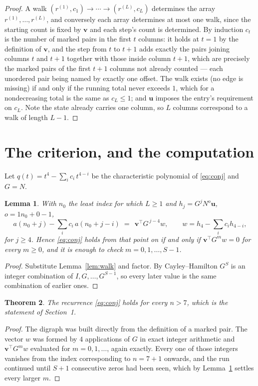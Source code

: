 \documentclass[11pt,a4paper]{article}
\theoremstyle{plain}
\newtheorem{theorem}{Theorem}
\newtheorem{lemma}[theorem]{Lemma}
\theoremstyle{definition}
\begin{document}
\begin{proof}
A walk $(r^{(1)},c_1)\to\cdots\to(r^{(L)},c_L)$ determines the array
$r^{(1)},\dots,r^{(L)}$, and conversely each array determines at most one walk, since the
starting count is fixed by $\mathbf{v}$ and each step's count is determined. By induction
$c_t$ is the number of marked pairs in the first $t$ columns: it holds at $t=1$ by the
definition of $\mathbf{v}$, and the step from $t$ to $t+1$ adds exactly the pairs joining
columns $t$ and $t+1$ together with those inside column $t+1$, which are precisely the marked
pairs of the first $t+1$ columns not already counted --- each unordered pair being named by
exactly one offset. The walk exists (no edge is missing) if and only if the running total
never exceeds $1$, which for a nondecreasing total is the same as $c_L\le1$; and
$\mathbf{u}$ imposes the entry's requirement on $c_L$. Note the state already carries one
column, so $L$ columns correspond to a walk of length $L-1$.
\end{proof}

\section{The criterion, and the computation}

Let $q(t)=t^{4}-\sum_i c_i\,t^{4-i}$ be the characteristic polynomial of
\eqref{eq:conj} and $G=N$.

\begin{lemma}\label{lem:crit}
With $n_0$ the least index for which $L\ge1$ and $h_j=G^{j}N^{o}\mathbf{u}$,
$o=1n_0+0-1$,
\[
a(n_0+j)-\sum_i c_i\,a(n_0+j-i)\;=\;\,\mathbf{v}^{\!\top}G^{\,j-4}w,
\qquad w=h_{4}-\sum_i c_i h_{4-i},
\]
for $j\ge4$. Hence \eqref{eq:conj} holds from that point on if and only if
$\mathbf{v}^{\!\top}G^{m}w=0$ for every $m\ge0$, and it is enough to check
$m=0,1,\dots,S-1$.
\end{lemma}

\begin{proof}
Substitute Lemma~\ref{lem:walk} and factor. By Cayley--Hamilton $G^{S}$ is an integer
combination of $I,G,\dots,G^{S-1}$, so every later value is the same combination of earlier
ones.
\end{proof}

\begin{theorem}
The recurrence \eqref{eq:conj} holds for every $n>7$, which is the statement of
Section~1.
\end{theorem}

\begin{proof}
The digraph was built directly from the definition of a marked pair. The vector $w$ was
formed by $4$ applications of $G$ in exact integer arithmetic and
$\mathbf{v}^{\!\top}G^{m}w$ evaluated for $m=0,1,\dots$, again exactly. Every one of
those integers vanishes from the index corresponding to $n=7+1$ onwards, and the run
continued until $S+1$ consecutive zeros had been seen, which by Lemma~\ref{lem:crit}
settles every larger $m$.
\end{proof}
\end{document}
